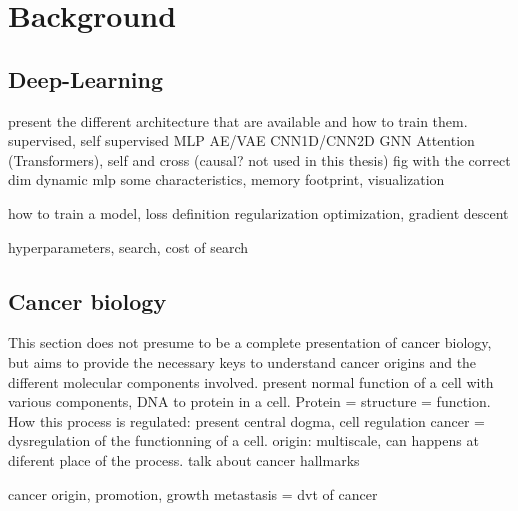 \documentclass[../main.tex]{subfiles}
\begin{document}
\chapter{Background}\label{chap:background}
\minitocpage

\section{Deep-Learning}
present the different architecture that are available and how to train them.
supervised, self supervised
MLP
AE/VAE
CNN1D/CNN2D
GNN
Attention (Transformers), self and cross (causal? not used in this thesis)
fig with the correct dim
dynamic mlp
some characteristics, memory footprint, visualization

how to train a model, loss definition
regularization
optimization, gradient descent

hyperparameters, search, cost of search
\section{Cancer biology}
This section does not presume to be a complete presentation of cancer biology, but aims to provide the necessary keys to understand cancer origins and the different molecular components involved.
present normal function of a cell with various components, DNA to protein in a cell. Protein = structure = function.
How this process is regulated: present central dogma, cell regulation
cancer = dysregulation of the functionning of a cell.
origin: multiscale, can happens at diferent place of the process.
talk about cancer hallmarks

cancer origin, promotion, growth metastasis = dvt of cancer
\end{document}
